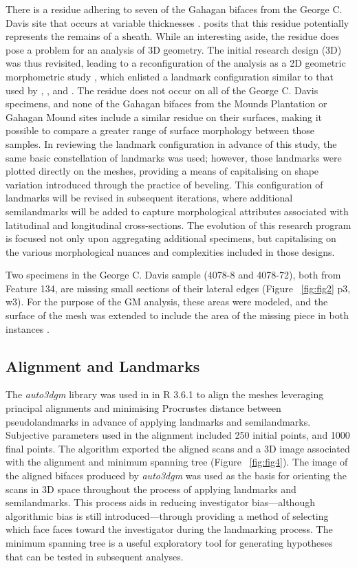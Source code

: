 \documentclass[review]{elsarticle}
\begin{document}
There is a residue adhering to seven of the Gahagan bifaces from the George C. Davis site that occurs at variable thicknesses \citep[Figure 2]{RN11783}. \citet[228]{RN3684} posits that this residue potentially represents the remains of a sheath. While an interesting aside, the residue does pose a problem for an analysis of 3D geometry. The initial research design (3D) was thus revisited, leading to a reconfiguration of the analysis as a 2D geometric morphometric study \citep{RN11783}, which enlisted a landmark configuration similar to that used by \citet[Figure 2]{RN1754}, \citet[Figure 2]{RN1736}, and \citet[Figure 1]{RN11731}. The residue does not occur on all of the George C. Davis specimens, and none of the Gahagan bifaces from the Mounds Plantation or Gahagan Mound sites include a similar residue on their surfaces, making it possible to compare a greater range of surface morphology between those samples. In reviewing the landmark configuration in advance of this study, the same basic constellation of landmarks was used; however, those landmarks were plotted directly on the meshes, providing a means of capitalising on shape variation introduced through the practice of beveling. This configuration of landmarks will be revised in subsequent iterations, where additional semilandmarks will be added to capture morphological attributes associated with latitudinal and longitudinal cross-sections. The evolution of this research program is focused not only upon aggregating additional specimens, but capitalising on the various morphological nuances and complexities included in those designs.

Two specimens in the George C. Davis sample (4078-8 and 4078-72), both from Feature 134, are missing small sections of their lateral edges (Figure ~\ref{fig:fig2} p3, w3). For the purpose of the GM analysis, these areas were modeled, and the surface of the mesh was extended to include the area of the missing piece in both instances \citep{RN20850}.

\subsection*{Alignment and Landmarks}

The \textit{auto3dgm} library \citep{RN20822} was used in in R 3.6.1 \citep{R} to align the meshes leveraging principal alignments and minimising Procrustes distance between pseudolandmarks in advance of applying landmarks and semilandmarks. Subjective parameters used in the alignment included 250 initial points, and 1000 final points. The algorithm exported the aligned scans and a 3D image associated with the alignment and minimum spanning tree (Figure ~\ref{fig:fig4}). The image of the aligned bifaces produced by \textit{auto3dgm} was used as the basis for orienting the scans in 3D space throughout the process of applying landmarks and semilandmarks. This process aids in reducing investigator bias---although algorithmic bias is still introduced---through providing a method of selecting which face faces toward the investigator during the landmarking process. The minimum spanning tree is a useful exploratory tool for generating hypotheses that can be tested in subsequent analyses.
\end{document}
